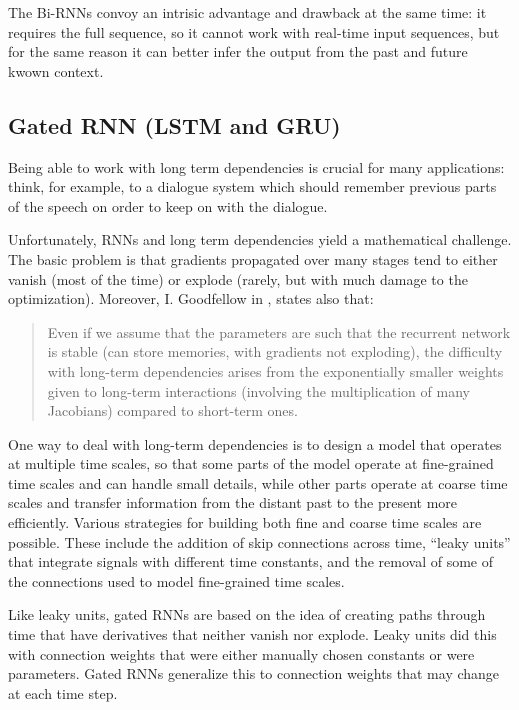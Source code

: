The Bi-RNNs convoy an intrisic advantage and drawback at the same
time: it requires the full sequence, so it cannot work with real-time
input sequences, but for the same reason it can better infer the
output from the past and future kwown context.

\subsection{Gated RNN (LSTM and GRU)}
\label{subsec:gated-rnn}

Being able to work with long term dependencies is crucial for many
applications: think, for example, to a dialogue system which should
remember previous parts of the speech on order to keep on with the
dialogue.

Unfortunately, RNNs and long term dependencies yield a mathematical
challenge. The basic problem is that gradients propagated over many
stages tend to either vanish (most of the time) or explode (rarely,
but with much damage to the optimization). Moreover, I. Goodfellow
\etal{} in , states also that:

\begin{quote}
  Even if we assume that the parameters are such that the recurrent
  network is stable (can store memories, with gradients not
  exploding), the diﬃculty with long-term dependencies arises from the
  exponentially smaller weights given to long-term interactions
  (involving the multiplication of many Jacobians) compared to
  short-term ones.
\end{quote}

One way to deal with long-term dependencies is to design a model that
operates at multiple time scales, so that some parts of the model
operate at ﬁne-grained time scales and can handle small details, while
other parts operate at coarse time scales and transfer information
from the distant past to the present more eﬃciently. Various
strategies for building both ﬁne and coarse time scales are possible.
These include the addition of skip connections across time, ``leaky
units'' that integrate signals with diﬀerent time constants, and the
removal of some of the connections used to model ﬁne-grained time
scales.

Like leaky units, gated RNNs are based on the idea of creating paths
through time that have derivatives that neither vanish nor explode.
Leaky units did this with connection weights that were either manually
chosen constants or were parameters. Gated RNNs generalize this to
connection weights that may change at each time step.

